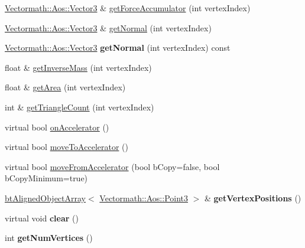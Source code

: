 \begin{DoxyCompactItemize}
\hyperlink{classVectormath_1_1Aos_1_1Vector3}{Vectormath\+::\+Aos\+::\+Vector3} \& \hyperlink{classbtSoftBodyVertexData_a34e1fdb82d6db75a4c22409632c3b369}{get\+Force\+Accumulator} (int vertex\+Index)
\item 
\hyperlink{classVectormath_1_1Aos_1_1Vector3}{Vectormath\+::\+Aos\+::\+Vector3} \& \hyperlink{classbtSoftBodyVertexData_a1404390d4cbbf841e1749dc1779fd104}{get\+Normal} (int vertex\+Index)
\item 
\mbox{\label{classbtSoftBodyVertexData_a72ca8247eb869e8a5ef81855f297b0d6}} 
\hyperlink{classVectormath_1_1Aos_1_1Vector3}{Vectormath\+::\+Aos\+::\+Vector3} {\bfseries get\+Normal} (int vertex\+Index) const
\item 
float \& \hyperlink{classbtSoftBodyVertexData_af635ef3bb6d2b272f6b95d453bc05761}{get\+Inverse\+Mass} (int vertex\+Index)
\item 
float \& \hyperlink{classbtSoftBodyVertexData_aed372e4aa15c1101feabec4ea7fe80a2}{get\+Area} (int vertex\+Index)
\item 
int \& \hyperlink{classbtSoftBodyVertexData_a8c4f3283367407c593745929aaf7d639}{get\+Triangle\+Count} (int vertex\+Index)
\item 
virtual bool \hyperlink{classbtSoftBodyVertexData_a6512d196039f6445489a093ad18f7764}{on\+Accelerator} ()
\item 
virtual bool \hyperlink{classbtSoftBodyVertexData_a2d3f04a5b2461bf95beca6f3fc48e28b}{move\+To\+Accelerator} ()
\item 
virtual bool \hyperlink{classbtSoftBodyVertexData_aaa8ab4065ecf47a9c3b946b67b6c9f1b}{move\+From\+Accelerator} (bool b\+Copy=false, bool b\+Copy\+Minimum=true)
\item 
\mbox{\label{classbtSoftBodyVertexData_af168e43ddea128f820eaacba02ea4302}} 
\hyperlink{classbtAlignedObjectArray}{bt\+Aligned\+Object\+Array}$<$ \hyperlink{classVectormath_1_1Aos_1_1Point3}{Vectormath\+::\+Aos\+::\+Point3} $>$ \& {\bfseries get\+Vertex\+Positions} ()
\item 
\mbox{\label{classbtSoftBodyVertexData_aff881f14a4ae961dd8420969e1115090}} 
virtual void {\bfseries clear} ()
\item 
\mbox{\label{classbtSoftBodyVertexData_a701997d46cf9d90f0cd22abda13d572c}} 
int {\bfseries get\+Num\+Vertices} ()

\end{DoxyCompactItemize}
